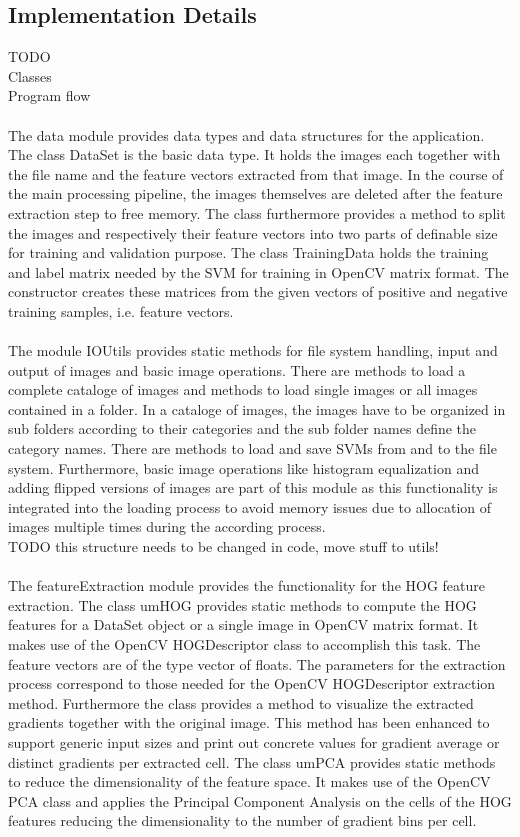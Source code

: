 \subsection{Implementation Details}

TODO
\\
Classes
\\
Program flow
%
\\
\\
The data module provides data types and data structures for the application. The class DataSet is the basic data type. It holds the images each together with the file name and the feature vectors extracted from that image. In the course of the main processing pipeline, the images themselves are deleted after the feature extraction step to free memory. The class furthermore provides a method to split the images and respectively their feature vectors into two parts of definable size for training and validation purpose. The class TrainingData holds the training and label matrix needed by the SVM for training in OpenCV matrix format. The constructor creates these matrices from the given vectors of positive and negative training samples, i.e. feature vectors.
\\
\\
The module IOUtils provides static methods for file system handling, input and output of images and basic image operations. There are methods to load a complete cataloge of images and methods to load single images or all images contained in a folder. In a cataloge of images, the images have to be organized in sub folders according to their categories and the sub folder names define the category names. There are methods to load and save SVMs from and to the file system. Furthermore, basic image operations like histogram equalization and adding flipped versions of images are part of this module as this functionality is integrated into the loading process to avoid memory issues due to allocation of images multiple times during the according process.
\\
TODO this structure needs to be changed in code, move stuff to utils!
\\
\\
The featureExtraction module provides the functionality for the HOG feature extraction. The class umHOG provides static methods to compute the HOG features for a DataSet object or a single image in OpenCV matrix format. It makes use of the OpenCV HOGDescriptor class to accomplish this task. The feature vectors are of the type vector of floats. The parameters for the extraction process correspond to those needed for the OpenCV HOGDescriptor extraction method. Furthermore the class provides a method to visualize the extracted gradients together with the original image. This method  has been enhanced to support generic input sizes and print out concrete values for gradient average or distinct gradients per extracted cell. The class umPCA provides static methods to reduce the dimensionality of the feature space. It makes use of the OpenCV PCA class and applies the Principal Component Analysis on the cells of the HOG features reducing the dimensionality to the number of gradient bins per cell.
